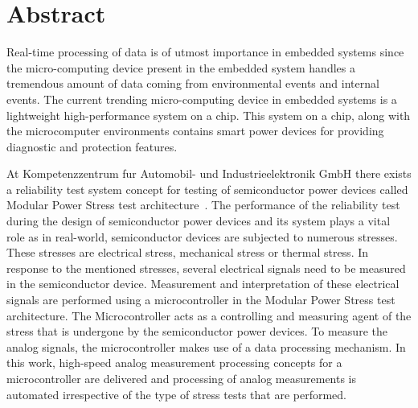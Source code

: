 \chapter*{Abstract}


Real-time processing of data is of utmost importance in embedded systems since the micro-computing device present in the embedded system handles a tremendous amount of data coming from environmental events and internal events. 
The current trending micro-computing device in embedded systems is a lightweight high-performance system on a chip. 
This system on a chip, along with the microcomputer environments contains smart power devices for providing diagnostic and protection features. 

At Kompetenzzentrum fur Automobil- und Industrieelektronik GmbH there exists a reliability test system concept for testing of semiconductor power devices called Modular Power Stress test architecture~\cite{Steinwender2016}.
The performance of the reliability test during the design of semiconductor power devices and its system plays a vital role as in real-world, semiconductor devices are subjected to numerous stresses.
These stresses are electrical stress, mechanical stress or thermal stress. 
In response to the mentioned stresses, several electrical signals need to be measured in the semiconductor device.
Measurement and interpretation of these electrical signals are performed using a microcontroller in the Modular Power Stress test architecture. 
The Microcontroller acts as a controlling and measuring agent of the stress that is undergone by the semiconductor power devices.
To measure the analog signals, the microcontroller makes use of a data processing mechanism.  
In this work, high-speed analog measurement processing concepts for a microcontroller are delivered and processing of analog measurements is automated irrespective of the type of stress tests that are performed. 

\vspace{1cm}
